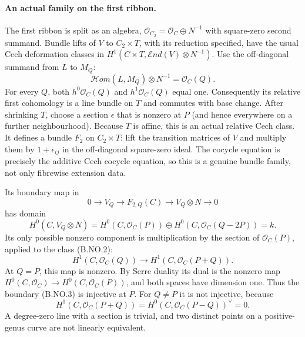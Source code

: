 \paragraph{An actual family on the first ribbon.}
The first ribbon is split as an algebra,
$\mathcal O_{C_2}=\mathcal O_C\oplus N^{-1}$ with square-zero
second summand. Bundle lifts of $V$ to $C_2\times T$, with its
reduction specified, have the usual Cech deformation classes in
$H^1(C\times T,\mathcal End(V)\otimes N^{-1})$.
Use the off-diagonal summand from $L$ to $M_Q$:
\[
 \mathcal Hom(L,M_Q)\otimes N^{-1}=\mathcal O_C(Q).
                                                               \tag{B.NO.2}
\]
For every $Q$, both $h^0\mathcal O_C(Q)$ and
$h^1\mathcal O_C(Q)$ equal one. Consequently its relative first
cohomology is a line bundle on $T$ and commutes with base change.
After shrinking $T$, choose a section $\epsilon$ that is nonzero
at $P$ (and hence everywhere on a further neighbourhood).
Because $T$ is affine, this is an actual relative Cech class.
It defines a bundle $F_2$ on $C_2\times T$: lift the transition
matrices of $V$ and multiply them by $1+\epsilon_{ij}$ in the
off-diagonal square-zero ideal. The cocycle equation is precisely
the additive Cech cocycle equation, so this is a genuine bundle
family, not only fibrewise extension data.

Its boundary map in
\[
 0\longrightarrow V_Q\longrightarrow F_{2,Q}(C)
     \longrightarrow V_Q\otimes N\longrightarrow0
\]
has domain
\[
 H^0(C,V_Q\otimes N)
   =H^0(C,\mathcal O_C(P))\oplus
      H^0(C,\mathcal O_C(Q-2P))=k.                        \tag{B.NO.3}
\]
Its only possible nonzero component is multiplication by the
section of $\mathcal O_C(P)$, applied to the class (B.NO.2):
\[
 H^1(C,\mathcal O_C(Q))
       \longrightarrow H^1(C,\mathcal O_C(P+Q)).          \tag{B.NO.4}
\]
At $Q=P$, this map is nonzero. By Serre duality its dual is the
nonzero map $H^0(C,\mathcal O_C)\to H^0(C,\mathcal O_C(P))$,
and both spaces have dimension one. Thus the boundary (B.NO.3)
is injective at $P$. For $Q\ne P$ it is not injective, because
\[
 H^1(C,\mathcal O_C(P+Q))
       =H^0(C,\mathcal O_C(P-Q))^\vee=0.                 \tag{B.NO.5}
\]
A degree-zero line with a section is trivial, and two distinct
points on a positive-genus curve are not linearly equivalent.

